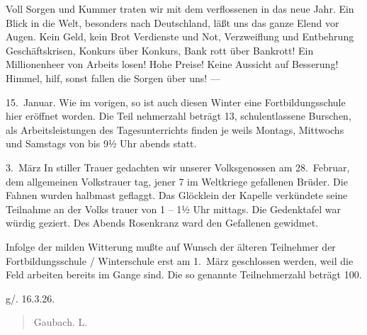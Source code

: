 

\pstart
Voll Sorgen und Kummer traten wir\ob
mit dem verflossenen in das neue Jahr. Ein Blick\ob
in die Welt, besonders nach Deutschland, läßt uns\ob
das ganze Elend vor Augen. Kein Geld, kein Brot\ohb
Verdienste und Not, Verzweiflung und Entbehrung\ob
Geschäftskrisen, Konkurs über Konkurs, Bank\ohb
rott über Bankrott! Ein Millionenheer von Arbeits\ohb
losen! Hohe Preise! Keine Aussicht auf Besserung!\ob
Himmel, hilf, sonst fallen die Sorgen über uns! —

15.\ Januar.  Wie im vorigen, so ist auch diesen Winter eine\ob
Fortbildungsschule hier eröffnet worden. Die Teil\ohb
nehmerzahl beträgt 13, schulentlassene Burschen, als\ob
Arbeitsleistungen des Tagesunterrichts finden je\ohb
weils Montags, Mittwochs und Samstags von bis 9½ Uhr abends statt.

3.\ März      In stiller Trauer gedachten wir unserer Volksgenossen\ob
am 28.\ Februar, dem allgemeinen Volkstrauer\ohb
tag, jener 7 im Weltkriege gefallenen Brüder. Die\ob
Fahnen wurden halbmast geflaggt. Das Glöcklein der\ob
Kapelle verkündete seine Teilnahme an der Volks\ohb
trauer von 1 – 1½ Uhr mittags. Die Gedenktafel war\ob
würdig geziert. Des Abends Rosenkranz ward den\ob
Gefallenen gewidmet.

Infolge der milden Witterung mußte auf Wunsch\ob
der älteren Teilnehmer der Fortbildungsschule / Winterschule\ob
erst am 1.\ März geschlossen werden, weil die Feld\ohb
arbeiten bereits im Gange sind. Die so\ohb
genannte Teilnehmerzahl beträgt 100\unsicher.

g/. 16.3.26.

\pend
\begin{verse}
Gaubach. L.
\end{verse}
\pstart
\pend
